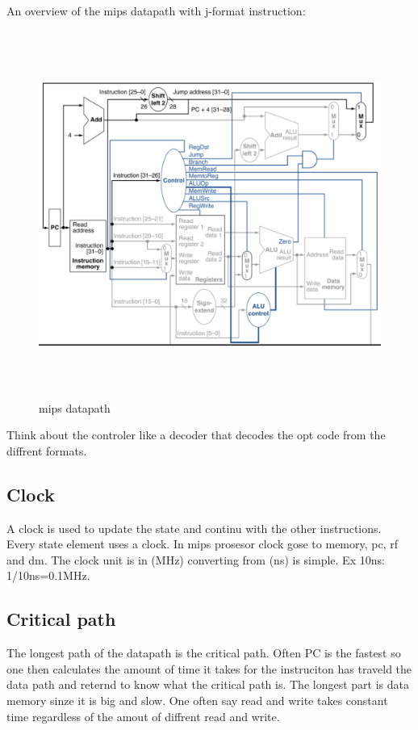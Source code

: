 \newpage

An overview of the mips datapath with j-format instruction:
\begin{figure}[h]
    \vspace{10mm}
    \centering
    \includegraphics[width=16cm, height=12cm]{image/mips-datapath.png} 
    \caption{mips datapath}
    \label{mips-datapath}
\end{figure}

Think about the controler like a decoder that decodes the opt code from the diffrent formats.

\newpage

\subsection{Clock}
A clock is used to update the state and continu with the other instructions. Every state element uses
a clock. In mips prosesor clock gose to memory, pc, rf and dm. The clock unit is in (MHz) converting
from (ns) is simple. Ex 10ns: 1/10ns=0.1MHz.

\subsection{Critical path}
The longest path of the datapath is the critical path. Often PC is the fastest so one then calculates the
amount of time it takes for the instruciton has traveld the data path and reternd to know what the
critical path is. The longest part is data memory sinze it is big and slow. One often say read and write
takes constant time regardless of the amout of diffrent read and write.


